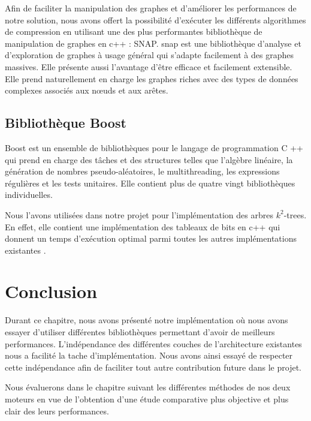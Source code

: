 		Afin de faciliter la manipulation des graphes et d'améliorer les performances de notre solution, nous avons offert la possibilité d'exécuter les différents algorithmes de compression en utilisant une des plus performantes bibliothèque de manipulation de graphes en c++ : SNAP.
		\gls{snap} est une bibliothèque d'analyse et d'exploration de graphes à usage général qui s'adapte facilement à des graphes massives. Elle présente aussi l'avantage d'être  efficace et facilement extensible. Elle prend naturellement en charge les graphes riches avec des types de données complexes associés aux nœuds et aux arêtes. 
		
		\subsection{Bibliothèque Boost}
		

Boost est un ensemble de bibliothèques pour le langage de programmation C ++ qui prend en charge des tâches et des structures telles que l'algèbre linéaire, la génération de nombres pseudo-aléatoires, le multithreading, les expressions régulières et les tests unitaires. Elle contient plus de quatre vingt bibliothèques individuelles.

Nous l'avons utilisées dans notre projet pour l'implémentation des arbres $k^2$-trees. En effet, elle contient une implémentation des tableaux de bits en c++ qui donnent un temps d'exécution optimal parmi toutes les autres implémentations existantes \citep{pieterse2010performance}.  


	\section{Conclusion}
	
Durant ce chapitre, nous avons présenté notre implémentation où nous avons essayer d'utiliser différentes bibliothèques permettant d'avoir de meilleurs performances. L'indépendance des différentes couches de l'architecture existantes nous a facilité la tache d'implémentation. Nous avons ainsi essayé de respecter cette indépendance afin de faciliter tout autre contribution future dans le projet. 

Nous évaluerons dans le chapitre suivant les différentes méthodes de nos deux moteurs en vue de l'obtention d'une étude comparative plus objective et plus clair des leurs performances.